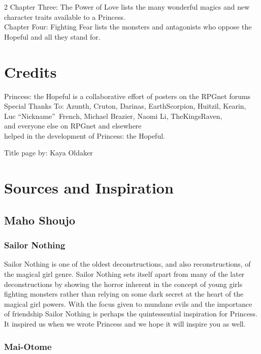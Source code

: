 \begin{multicols}{2}
\noindent Chapter Three: The Power of Love lists the many wonderful magics and new character traits available to a Princess. \\

\noindent Chapter Four: Fighting Fear lists the monsters and antagonists who oppose the Hopeful and all they stand for.

\section*{Credits}

Princess: the Hopeful is a collaborative effort of posters on the RPGnet forums \\
Special Thanks To: Azunth, Cruton, Darinas, EarthScorpion, Huitzil, Kearin,\\ Luc \textquotedblleft Nickname\textquotedblright\, French, Michael Brazier, Naomi Li, TheKingsRaven,\\ and everyone else on RPGnet and elsewhere \\ helped in the development of Princess: the Hopeful. 

Title page by: Kaya Oldaker

\section*{Sources and Inspiration}

\subsection*{Maho Shoujo}

\subsubsection*{Sailor Nothing}

Sailor Nothing is one of the oldest deconstructions, and also reconstructions, of the magical girl genre. Sailor Nothing sets itself apart from many of the later deconstructions by showing the horror inherent in the concept of young girls fighting monsters rather than relying on some dark secret at the heart of the magical girl powers. With the focus given to mundane evils and the importance of friendship Sailor Nothing is perhaps the quintessential inspiration for Princess. It inspired us when we wrote Princess and we hope it will inspire you as well. 

\subsubsection*{Mai-Otome}


\end{multicols}
